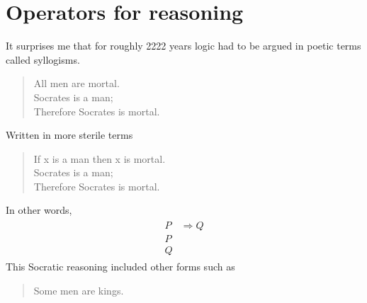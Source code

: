 \section{Operators for reasoning}

It surprises me that for roughly 2222 years logic had to be argued 
in poetic terms called syllogisms.  
\begin{quote}
    All men are mortal.\\
    Socrates is a man;\\
    Therefore Socrates is mortal.
\end{quote}
Written in more sterile terms 
\begin{quote}
    If x is a man then x is mortal.\\
    Socrates is a man;\\
    Therefore Socrates is mortal.
\end{quote}
In other words,
\begin{gather}
    \tag{Modus Ponens}
    \begin{array}{rl}
        P &\Rightarrow Q\\
        P\\
    \hline 
        Q
    \end{array}
\end{gather}
This Socratic reasoning included other forms such as 
\begin{quote}
    Some men are kings.\\
    
\end{quote}



